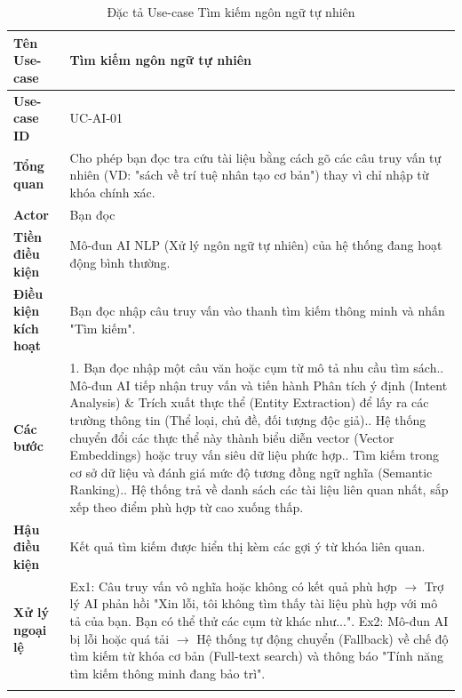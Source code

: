 \begin{longtable}{|p{3.5cm}|p{11.5cm}|}
    \hline
    \textbf{Tên Use-case} & \textbf{Tìm kiếm ngôn ngữ tự nhiên } \\
    \hline
    \textbf{Use-case ID} & UC-AI-01 \\
    \hline
    \textbf{Tổng quan} & Cho phép bạn đọc tra cứu tài liệu bằng cách gõ các câu truy vấn tự nhiên (VD: "sách về trí tuệ nhân tạo cơ bản") thay vì chỉ nhập từ khóa chính xác. \\
    \hline
    \textbf{Actor} & Bạn đọc  \\
    \hline
    \textbf{Tiền điều kiện} & Mô-đun AI NLP (Xử lý ngôn ngữ tự nhiên) của hệ thống đang hoạt động bình thường. \\
    \hline
    \textbf{Điều kiện kích hoạt} & Bạn đọc nhập câu truy vấn vào thanh tìm kiếm thông minh và nhấn "Tìm kiếm". \\
    \hline
    \textbf{Các bước} & 
    1. Bạn đọc nhập một câu văn hoặc cụm từ mô tả nhu cầu tìm sách.\newline
    2. Mô-đun AI tiếp nhận truy vấn và tiến hành Phân tích ý định (Intent Analysis) \& Trích xuất thực thể (Entity Extraction) để lấy ra các trường thông tin (Thể loại, chủ đề, đối tượng độc giả).\newline
    3. Hệ thống chuyển đổi các thực thể này thành biểu diễn vector (Vector Embeddings) hoặc truy vấn siêu dữ liệu phức hợp.\newline
    4. Tìm kiếm trong cơ sở dữ liệu và đánh giá mức độ tương đồng ngữ nghĩa (Semantic Ranking).\newline
    5. Hệ thống trả về danh sách các tài liệu liên quan nhất, sắp xếp theo điểm phù hợp từ cao xuống thấp. \\
    \hline
    \textbf{Hậu điều kiện} & Kết quả tìm kiếm được hiển thị kèm các gợi ý từ khóa liên quan. \\
    \hline
    \textbf{Xử lý ngoại lệ} & 
    Ex1: Câu truy vấn vô nghĩa hoặc không có kết quả phù hợp $\rightarrow$ Trợ lý AI phản hồi "Xin lỗi, tôi không tìm thấy tài liệu phù hợp với mô tả của bạn. Bạn có thể thử các cụm từ khác như...".\newline
    Ex2: Mô-đun AI bị lỗi hoặc quá tải $\rightarrow$ Hệ thống tự động chuyển (Fallback) về chế độ tìm kiếm từ khóa cơ bản (Full-text search) và thông báo "Tính năng tìm kiếm thông minh đang bảo trì". \\
    \hline
    \caption{Đặc tả Use-case Tìm kiếm ngôn ngữ tự nhiên}
\end{longtable}

